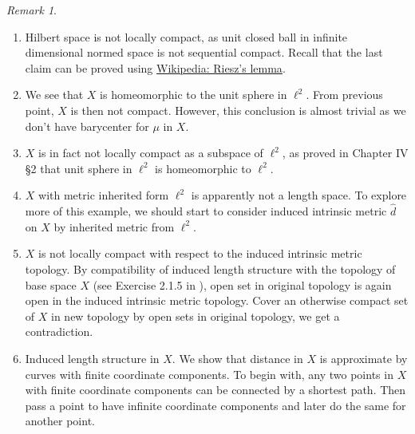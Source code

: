 \documentclass{report}
\theoremstyle{remark}
\newtheorem{rmk}{Remark}
\theoremstyle{definition}
\begin{document}
\begin{rmk}
	\begin{enumerate}
		\item Hilbert space is not locally compact, as unit closed ball in infinite dimensional normed space is not sequential compact. Recall that the last claim can be proved using \href{https://en.wikipedia.org/wiki/Riesz%27s_lemma}{Wikipedia: Riesz's lemma}.
		\item %
		      We see that $X$ is homeomorphic to the unit sphere in $\ell^2$. From previous point, $X$ is then not compact. However, this conclusion is almost trivial as we don't have barycenter for $\mu$ in $X$.
		\item $X$ is in fact not locally compact as a subspace of $\ell^2$, as proved in \cite{bessaga1975selected} Chapter IV §2 that unit sphere in $\ell^2$ is homeomorphic to $\ell^2$.
		\item $X$ with metric inherited form $\ell^2$ is apparently not a length space. To explore more of this example, we should start to consider induced intrinsic metric $\hat{d}$ on $X$ by inherited metric from $\ell^2$.
		\item $X$ is not locally compact with respect to the induced intrinsic metric topology. By compatibility of induced length structure with the topology of base space $X$ (see Exercise 2.1.5 in \cite{burago2001course}), open set in original topology is again open in the induced intrinsic metric topology. Cover an otherwise compact set of $X$ in new topology by open sets in original topology, we get a contradiction.
		\item %
		      Induced length structure in $X$. %
		      We show that distance in $X$ is approximate by curves with finite coordinate components. To begin with, any two points in $X$ with finite coordinate components can be connected by a shortest path. Then pass a point to have infinite coordinate components and later do the same for another point.

\end{enumerate}
\end{rmk}
\end{document}

